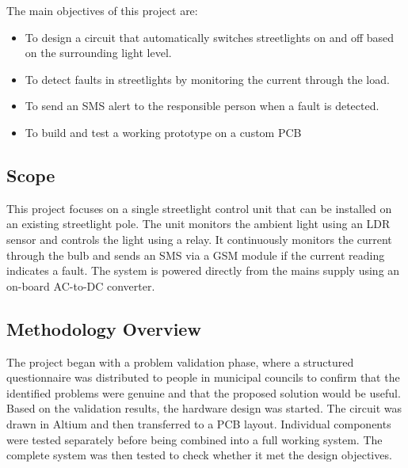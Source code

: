 \documentclass{article}
\begin{document}
The main objectives of this project are:
\begin{itemize}
    \item To design a circuit that automatically switches streetlights on and off based on the surrounding light level.
    \item To detect faults in streetlights by monitoring the current through the load.
    \item To send an SMS alert to the responsible person when a fault is detected.
    \item To build and test a working prototype on a custom PCB
\end{itemize}

\subsection{Scope}

This project focuses on a single streetlight control unit that can be installed on an existing streetlight pole. The unit monitors the ambient light using an LDR sensor and controls the light using a relay. It continuously monitors the current through the bulb and sends an SMS via a GSM module if the current reading indicates a fault. The system is powered directly from the mains supply using an on-board AC-to-DC converter.

\subsection{Methodology Overview}

The project began with a problem validation phase, where a structured questionnaire was distributed to people in municipal councils to confirm that the identified problems were genuine and that the proposed solution would be useful. Based on the validation results, the hardware design was started. The circuit was drawn in Altium and then transferred to a PCB layout. Individual components were tested separately before being combined into a full working system. The complete system was then tested to check whether it met the design objectives.
\end{document}
